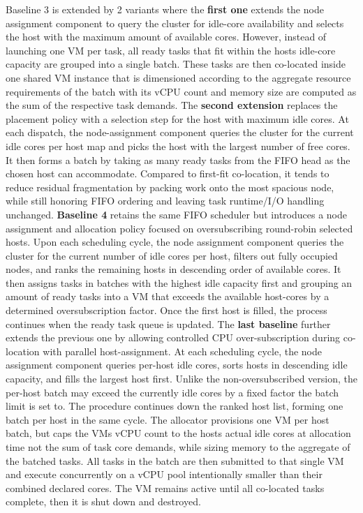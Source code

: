 Baseline 3 is extended by 2 variants where the \textbf{first one} extends the node assignment component to query the cluster for idle-core availability and selects the host with the maximum amount of available cores. However, instead of launching one VM per task, all ready tasks that fit within the hosts idle-core capacity are grouped into a single batch. These tasks are then co-located inside one shared VM instance that is dimensioned according to the aggregate resource requirements of the batch with its vCPU count and memory size are computed as the sum of the respective task demands.
The \textbf{second extension} replaces the placement policy with a selection step for the host with maximum idle cores. At each dispatch, the node-assignment component queries the cluster for the current idle cores per host map and picks the host with the largest number of free cores. It then forms a batch by taking as many ready tasks from the FIFO head as the chosen host can accommodate. Compared to first-fit co-location, it tends to reduce residual fragmentation by packing work onto the most spacious node, while still honoring FIFO ordering and leaving task runtime/I/O handling unchanged.
\textbf{Baseline 4} retains the same FIFO scheduler but introduces a node assignment and allocation policy focused on oversubscribing round-robin selected hosts. Upon each scheduling cycle, the node assignment component queries the cluster for the current number of idle cores per host, filters out fully occupied nodes, and ranks the remaining hosts in descending order of available cores. It then assigns tasks in batches with the highest idle capacity first and grouping an amount of ready tasks into a VM that exceeds the available host-cores by a determined oversubscription factor. Once the first host is filled, the process continues when the ready task queue is updated.
The \textbf{last baseline} further extends the previous one by allowing controlled CPU over-subscription during co-location with parallel host-assignment.
At each scheduling cycle, the node assignment component queries per-host idle cores, sorts hosts in descending idle capacity, and fills the largest host first. Unlike the non-oversubscribed version, the per-host batch may exceed the currently idle cores by a fixed factor the batch limit is set to. The procedure continues down the ranked host list, forming one batch per host in the same cycle.
The allocator provisions one VM per host batch, but caps the VMs vCPU count to the hosts actual idle cores at allocation time not the sum of task core demands, while sizing memory to the aggregate of the batched tasks. All tasks in the batch are then submitted to that single VM and execute concurrently on a vCPU pool intentionally smaller than their combined declared cores. The VM remains active until all co-located tasks complete, then it is shut down and destroyed.
